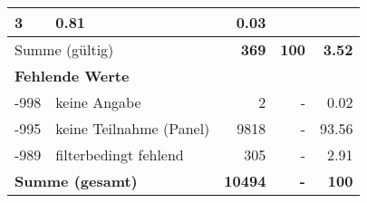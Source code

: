 \begin{longtable}{lXrrr}
       \num{3} &
       \num[round-mode=places,round-precision=2]{0,81} &
         \num[round-mode=places,round-precision=2]{0,03} \\
     \midrule
     \multicolumn{2}{l}{Summe (gültig)} &
       \textbf{\num{369}} &
     \textbf{100} &
       \textbf{\num[round-mode=places,round-precision=2]{3,52}} \\
     \multicolumn{5}{l}{\textbf{Fehlende Werte}}\\
       -998 &
       keine Angabe &
         \num{2} &
        - &
         \num[round-mode=places,round-precision=2]{0,02} \\
       -995 &
       keine Teilnahme (Panel) &
         \num{9818} &
        - &
         \num[round-mode=places,round-precision=2]{93,56} \\
       -989 &
       filterbedingt fehlend &
         \num{305} &
        - &
         \num[round-mode=places,round-precision=2]{2,91} \\
     \midrule
     \multicolumn{2}{l}{\textbf{Summe (gesamt)}} &
          \textbf{\num{10494}} &
        \textbf{-} &
        \textbf{100} \\
     \bottomrule
     \end{longtable}
     
